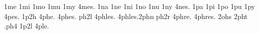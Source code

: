{1me                                                                             
1mi                                                                             
1mo                                                                             
1mu                                                                             
1my                                                                             
4mes.                                                                           
1na                                                                             
1ne                                                                             
1ni                                                                             
1no                                                                             
1nu                                                                             
1ny                                                                             
4nes.                                                                           
1pa                                                                             
1pi                                                                             
1po                                                                             
1pu                                                                             
1py                                                                             
4pes.                                                                           
1p2h                                                                            
4phe.                                                                           
4phes.                                                                          
ph2l                                                                            
4phles.                                                                         
4phles.2phn                                                                     
ph2r                                                                            
4phre.                                                                          
4phres.                                                                         
2ohs                                                                            
2pht                                                                            
.ph4                                                                            
1p2l                                                                            
4ple.                                                                           
}
